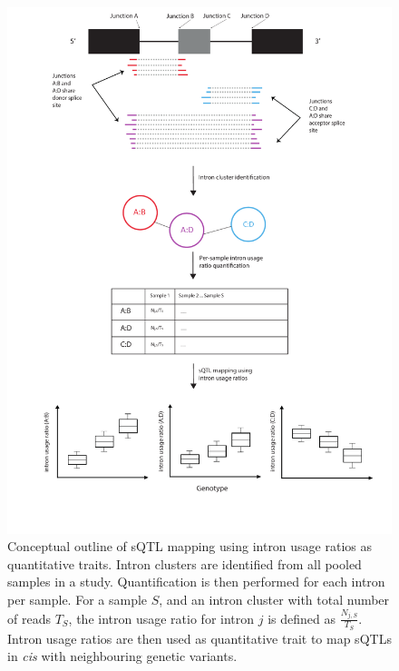 \begin{figure}[H]
    \centering
    \includegraphics[width=\textwidth]{leafcutter_conceptual}
    \caption[Conceptual overview of splicing quantitative trait loci mapping using intron usage ratios]{Conceptual outline of sQTL mapping using intron usage ratios as quantitative traits. Intron clusters are identified from all pooled samples in a study. Quantification is then performed for each intron per sample. For a sample $S$, and an intron cluster with total number of reads $T_{S}$, the intron usage ratio for intron $j$ is defined as $\frac{N_{j,S}}{T_{S}}$. Intron usage ratios are then used as quantitative trait to map sQTLs in \textit{cis} with neighbouring genetic variants.}
    \label{fig:leafcutter_conceptual}   
  \end{figure}


